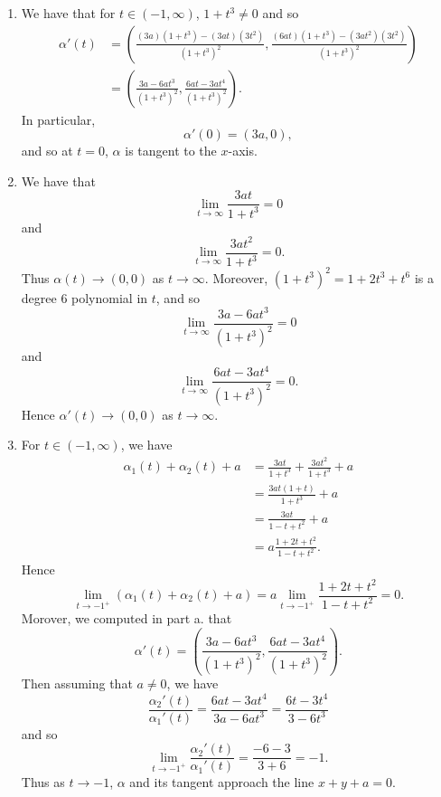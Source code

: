 \begin{ex}
\begin{enumerate}
\item We have that for $t \in (-1, \infty)$, $1+t^3 \not = 0$ and so
\begin{align*}
\alpha'(t) & = \left(\frac{(3a)(1+t^3) - (3at)(3t^2)}{(1+t^3)^2}, \frac{(6at)(1+t^3) - (3at^2)(3t^2)}{(1+t^3)^2}\right)\\
& = \left(\frac{3a - 6at^3}{(1+t^3)^2}, \frac{6at - 3at^4}{(1+t^3)^2}\right).
\end{align*}
In particular, \[\alpha'(0) = (3a, 0),\] and so at $t = 0$, $\alpha$ is tangent to the $x$-axis.

\item We have that \[\lim_{t\to\infty}\frac{3at}{1+t^3} = 0\] and \[\lim_{t\to\infty}\frac{3at^2}{1+t^3} = 0.\] Thus $\alpha(t) \to (0, 0)$ as $t\to\infty$. Moreover, $(1+t^3)^2 = 1 + 2t^3 + t^6$ is a degree 6 polynomial in $t$, and so \[\lim_{t\to\infty}\frac{3a-6at^3}{(1+t^3)^2} = 0\] and \[\lim_{t\to\infty}\frac{6at-3at^4}{(1+t^3)^2} = 0.\] Hence $\alpha'(t) \to (0, 0)$ as $t\to\infty$.

\item For $t \in (-1, \infty)$, we have
\begin{align*}
\alpha_1(t) + \alpha_2(t) + a & = \frac{3at}{1+t^3} + \frac{3at^2}{1+t^3} + a\\
& = \frac{3at(1+t)}{1+t^3} + a\\
& = \frac{3at}{1-t+t^2} + a\\
& = a\frac{1 + 2t + t^2}{1-t+t^2}.
\end{align*}
Hence \[\lim_{t\to -1^+}(\alpha_1(t) + \alpha_2(t) + a) = a\lim_{t\to -1^+}\frac{1+2t+t^2}{1-t+t^2} = 0.\] Morover, we computed in part a. that \[\alpha'(t) = \left(\frac{3a-6at^3}{(1+t^3)^2}, \frac{6at-3at^4}{(1+t^3)^2}\right).\] Then assuming that $a \not = 0$, we have \[\frac{\alpha_2'(t)}{\alpha_1'(t)} = \frac{6at-3at^4}{3a-6at^3} = \frac{6t-3t^4}{3-6t^3}\] and so \[\lim_{t\to-1^+}\frac{\alpha_2'(t)}{\alpha_1'(t)} = \frac{-6-3}{3+6} = -1.\] Thus as $t \to -1$, $\alpha$ and its tangent approach the line $x + y + a = 0$.
\end{enumerate}
\end{ex}


